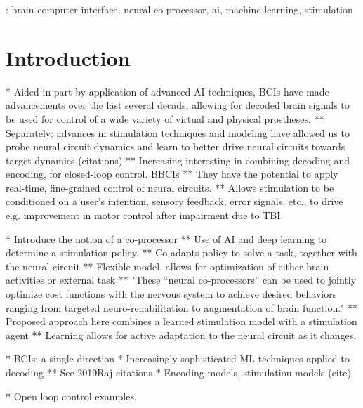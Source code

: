 \documentclass[12pt]{iopart}
\begin{document}
\vspace{2pc}
: brain-computer interface, neural co-processor, ai, machine learning, stimulation
%
%
\maketitle
% 
%



\section{Introduction}
* Aided in part by application of advanced AI techniques, BCIs have made
advancements over the last several decads, allowing for decoded
brain signals to be used for control of a wide variety of virtual and physical
prostheses.
** Separately: advances in stimulation techniques and modeling have allowed us to probe neural circuit dynamics and learn to better drive neural circuits towards target dynamics (citations)
** Increasing interesting in combining decoding and encoding, for closed-loop control. BBCIs
** They have the potential to apply real-time, fine-grained control of neural circuits.
** Allows stimulation to be conditioned on a user's intention, sensory feedback, error signals, etc., to drive e.g. improvement in motor control after impairment due to TBI.

* Introduce the notion of a co-processor
** Use of AI and deep learning to determine a stimulation policy.
** Co-adapts policy to solve a task, together with the neural circuit
** Flexible model, allows for optimization of either brain activities or external task
** "These ``neural co-processors'' can be used to jointly optimize cost functions with the
   nervous system to achieve desired behaviors ranging from targeted neuro-rehabilitation
   to augmentation of brain function."
** Proposed approach here combines a learned stimulation model with a stimulation agent
** Learning allows for active adaptation to the neural circuit as it changes.

* BCIs: a single direction
* Increasingly sophisticated ML techniques applied to decoding
** See 2019Raj citations
* Encoding models, stimulation models (cite)

* Open loop control examples.  \cite{khanna.openloop}
\end{document}
